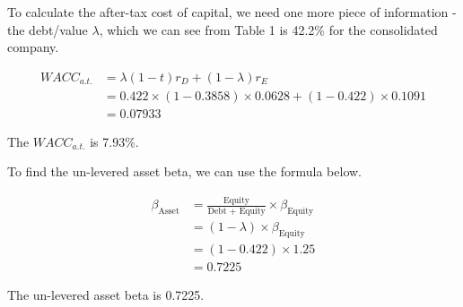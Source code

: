 \documentclass[letterpaper]{article}
\begin{document}
To calculate the after-tax cost of capital, we need one more piece of information - the debt/value $\lambda$, which we can see from Table 1 is 42.2\% for the consolidated company.

\begin{align*}
WACC_{a.t.} &= \lambda (1-t) r_D + (1-\lambda)r_E \\
            &= 0.422 \times (1 - 0.3858) \times 0.0628 + (1 - 0.422) \times 0.1091 \\
            &= 0.07933
\end{align*}

The $WACC_{a.t.}$ is 7.93\%.

To find the un-levered asset beta, we can use the formula below.

\begin{align*}
\beta_{\text{Asset}} &= \frac{\text{Equity}}{\text{Debt + Equity}}\times \beta_{\text{Equity}} \\
                    &= (1 - \lambda) \times \beta_{\text{Equity}} \\
                    &= (1 - 0.422) \times 1.25 \\
                    &= 0.7225
\end{align*}

The un-levered asset beta is 0.7225.
\end{document}
